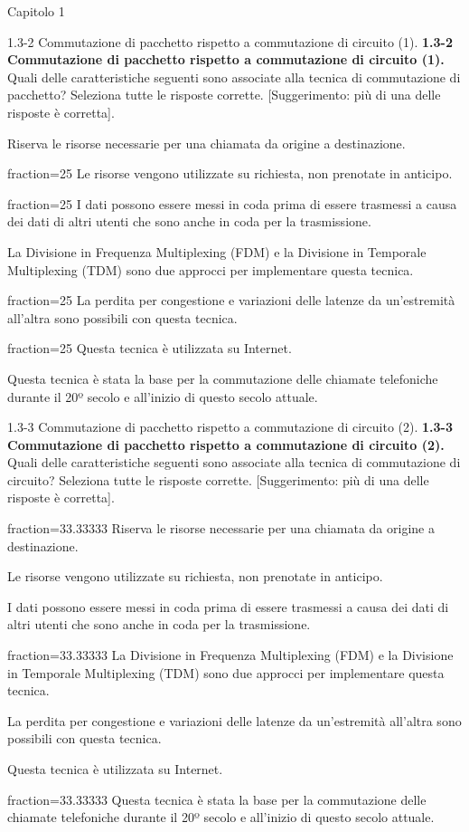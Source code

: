 \documentclass[a4paper]{article}
\begin{document}
\begin{quiz}{Capitolo 1}
\begin{multi}[points=1,multiple]{1.3-2 Commutazione di pacchetto rispetto a commutazione di circuito (1).}
\textbf{1.3-2 Commutazione di pacchetto rispetto a commutazione di circuito (1).} 
Quali delle caratteristiche seguenti sono associate alla tecnica di commutazione di pacchetto? Seleziona tutte le risposte corrette. [Suggerimento: più di una delle risposte è corretta].
\item Riserva le risorse necessarie per una chiamata da origine a destinazione.
\item[fraction=25] Le risorse vengono utilizzate su richiesta, non prenotate in anticipo.
\item[fraction=25] I dati possono essere messi in coda prima di essere trasmessi a causa dei dati di altri utenti che sono anche in coda per la trasmissione.
\item La Divisione in Frequenza Multiplexing (FDM) e la Divisione in Temporale Multiplexing (TDM) sono due approcci per implementare questa tecnica.
\item[fraction=25] La perdita per congestione e variazioni delle latenze da un'estremità all'altra sono possibili con questa tecnica.
\item[fraction=25] Questa tecnica è utilizzata su Internet.
\item Questa tecnica è stata la base per la commutazione delle chiamate telefoniche durante il 20º secolo e all'inizio di questo secolo attuale.
\end{multi}

\begin{multi}[points=1,multiple]{1.3-3 Commutazione di pacchetto rispetto a commutazione di circuito (2).}
\textbf{1.3-3 Commutazione di pacchetto rispetto a commutazione di circuito (2).} 
Quali delle caratteristiche seguenti sono associate alla tecnica di commutazione di circuito? Seleziona tutte le risposte corrette. [Suggerimento: più di una delle risposte è corretta].
\item[fraction=33.33333] Riserva le risorse necessarie per una chiamata da origine a destinazione.
\item Le risorse vengono utilizzate su richiesta, non prenotate in anticipo.
\item I dati possono essere messi in coda prima di essere trasmessi a causa dei dati di altri utenti che sono anche in coda per la trasmissione.
\item[fraction=33.33333] La Divisione in Frequenza Multiplexing (FDM) e la Divisione in Temporale Multiplexing (TDM) sono due approcci per implementare questa tecnica.
\item La perdita per congestione e variazioni delle latenze da un'estremità all'altra sono possibili con questa tecnica.
\item Questa tecnica è utilizzata su Internet.
\item[fraction=33.33333] Questa tecnica è stata la base per la commutazione delle chiamate telefoniche durante il 20º secolo e all'inizio di questo secolo attuale.
\end{multi}


\end{quiz}
\end{document}
